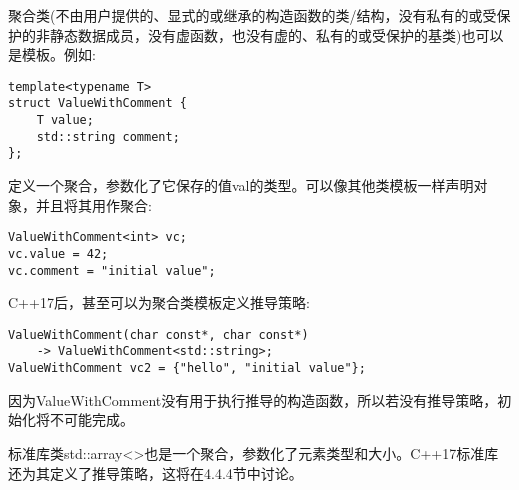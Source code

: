 
聚合类(不由用户提供的、显式的或继承的构造函数的类/结构，没有私有的或受保护的非静态数据成员，没有虚函数，也没有虚的、私有的或受保护的基类)也可以是模板。例如:

\begin{lstlisting}[style=styleCXX]
template<typename T>
struct ValueWithComment {
	T value;
	std::string comment;
};
\end{lstlisting}

定义一个聚合，参数化了它保存的值val的类型。可以像其他类模板一样声明对象，并且将其用作聚合:

\begin{lstlisting}[style=styleCXX]
ValueWithComment<int> vc;
vc.value = 42;
vc.comment = "initial value";
\end{lstlisting}

C++17后，甚至可以为聚合类模板定义推导策略:

\begin{lstlisting}[style=styleCXX]
ValueWithComment(char const*, char const*)
	-> ValueWithComment<std::string>;
ValueWithComment vc2 = {"hello", "initial value"};
\end{lstlisting}

因为ValueWithComment没有用于执行推导的构造函数，所以若没有推导策略，初始化将不可能完成。

标准库类std::array<>也是一个聚合，参数化了元素类型和大小。C++17标准库还为其定义了推导策略，这将在4.4.4节中讨论。
